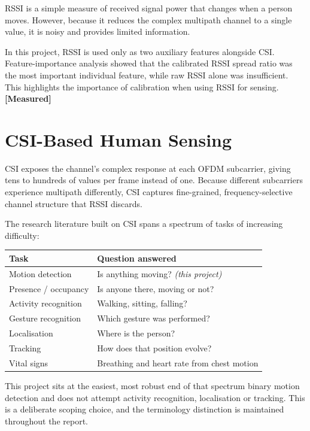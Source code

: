 \documentclass[11pt,a4paper,oneside]{report}
\newcommand{\evidencetag}[2]{{\small\sffamily\bfseries\textcolor{#1}{[#2]}}}
\newcommand{\Meas}{\evidencetag{accent}{Measured}}
\begin{document}
RSSI is a simple measure of received signal power that changes when a person moves. However, because it reduces the complex multipath channel to a single value, it is noisy and provides limited information.

In this project, RSSI is used only as two auxiliary features alongside CSI. Feature-importance analysis showed that the calibrated RSSI spread ratio was the most important individual feature, while raw RSSI alone was insufficient. This highlights the importance of calibration when using RSSI for sensing. \Meas

\section{CSI-Based Human Sensing}

CSI exposes the channel's complex response at each OFDM subcarrier, giving tens
to hundreds of values per frame instead of one. Because different subcarriers
experience multipath differently, CSI captures fine-grained, frequency-selective
channel structure that RSSI discards.

The research literature built on CSI spans a spectrum of tasks of increasing
difficulty:

\begin{center}
\begin{tabularx}{0.92\linewidth}{@{}lX@{}}
\toprule
\textbf{Task} & \textbf{Question answered} \\
\midrule
Motion detection      & Is anything moving? \quad \textit{(this project)} \\
Presence / occupancy  & Is anyone there, moving or not? \\
Activity recognition  & Walking, sitting, falling? \\
Gesture recognition   & Which gesture was performed? \\
Localisation          & Where is the person? \\
Tracking              & How does that position evolve? \\
Vital signs           & Breathing and heart rate from chest motion \\
\bottomrule
\end{tabularx}
\end{center}

\noindent
This project sits at the easiest, most robust end of that spectrum  binary
motion detection  and does not attempt activity recognition, localisation or
tracking. This is a deliberate scoping choice, and the terminology distinction
is maintained throughout the report.
\end{document}
